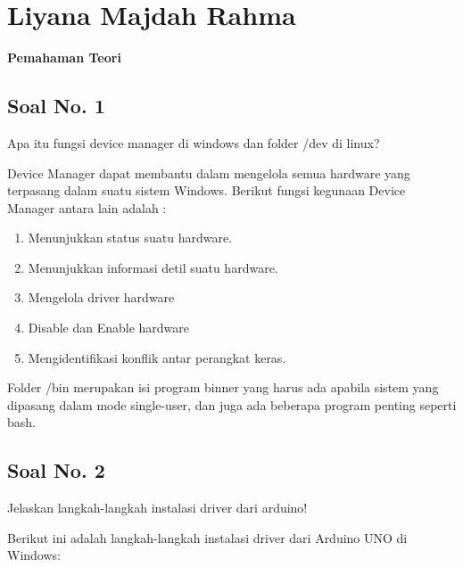 ﻿\section{Liyana Majdah Rahma}
{\Large \textbf{Pemahaman Teori}}
\subsection{Soal No. 1}
Apa itu fungsi device manager di windows dan folder /dev di linux?

\hfill \break
Device Manager  dapat  membantu dalam mengelola  semua hardware yang terpasang  dalam suatu sistem Windows. 
 Berikut fungsi kegunaan Device Manager antara lain adalah :
\begin{enumerate}
	\item Menunjukkan status suatu hardware.
	\item Menunjukkan informasi detil suatu hardware.
	\item Mengelola driver hardware
	\item Disable dan Enable hardware
	\item Mengidentifikasi konflik antar perangkat keras.
\end{enumerate}

\hfill \break
Folder /bin merupakan isi program binner yang harus ada apabila sistem yang dipasang dalam mode single-user, dan juga  ada beberapa program penting seperti bash.

\subsection{Soal No. 2}
Jelaskan langkah-langkah instalasi driver dari arduino!

\hfill \break
Berikut ini adalah langkah-langkah instalasi driver dari Arduino UNO di Windows:

